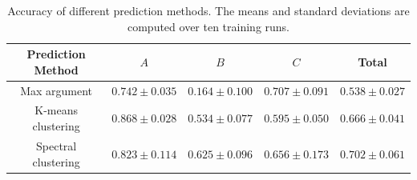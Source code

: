\documentclass[12pt]{article}
\begin{document}
    \begin{table}[htpb]
        \centering
        \caption{Accuracy of different prediction methods. The means and standard deviations are computed over ten training runs.}
        \label{tab:accuracy_w_different_prediction_ambiguous}
        \begin{tabular}{c|ccc|c}
            Prediction Method   & $A$               & $B$               & $C$               & Total             \\ \hline
            Max argument        & $0.742 \pm 0.035$ & $0.164 \pm 0.100$ & $0.707 \pm 0.091$ & $0.538 \pm 0.027$ \\
            K-means clustering  & $0.868 \pm 0.028$ & $0.534 \pm 0.077$ & $0.595 \pm 0.050$ & $0.666 \pm 0.041$ \\
            Spectral clustering & $0.823 \pm 0.114$ & $0.625 \pm 0.096$ & $0.656 \pm 0.173$ & $0.702 \pm 0.061$
        \end{tabular}
    \end{table}
\end{document}
